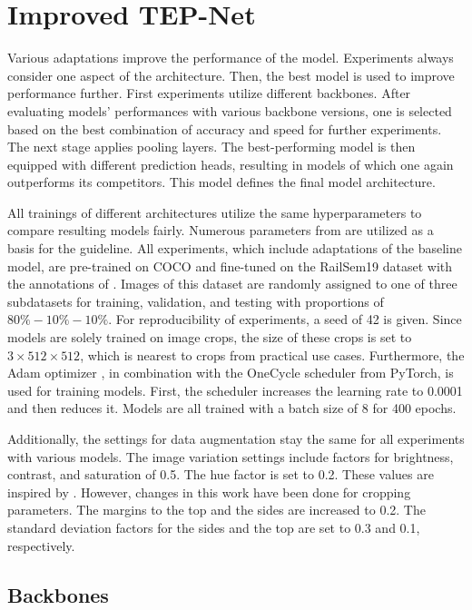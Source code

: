 \section{Improved TEP-Net}
\label{sec:improvedTEPNETExperiments}

Various adaptations improve the performance of the model.
Experiments always consider one aspect of the architecture.
Then, the best model is used to improve performance further.
First experiments utilize different backbones.
After evaluating models' performances with various backbone versions, one is selected based on the best combination of accuracy and speed for further experiments.
The next stage applies pooling layers.
The best-performing model is then equipped with different prediction heads, resulting in models of which one again outperforms its competitors.
This model defines the final model architecture.

All trainings of different architectures utilize the same hyperparameters to compare resulting models fairly.
Numerous parameters from \cite{tepNet2024} are utilized as a basis for the guideline.
All experiments, which include adaptations of the baseline model, are pre-trained on COCO and fine-tuned on the RailSem19 dataset with the annotations of \cite{tepNet2024}.
Images of this dataset are randomly assigned to one of three subdatasets for training, validation, and testing with proportions of $80\%-10\%-10\%$.
For reproducibility of experiments, a seed of 42 is given.
Since models are solely trained on image crops, the size of these crops is set to $3 \times 512 \times 512$, which is nearest to crops from practical use cases.
Furthermore, the Adam optimizer \cite{pytorchAdamOptimizer}, in combination with the OneCycle scheduler \cite{pytorch_oneCycleLR_docu} from PyTorch, is used for training models.
First, the scheduler increases the learning rate to 0.0001 and then reduces it.
Models are all trained with a batch size of 8 for 400 epochs.

Additionally, the settings for data augmentation stay the same for all experiments with various models.
The image variation settings include factors for brightness, contrast, and saturation of 0.5.
The hue factor is set to 0.2.
These values are inspired by \cite{tepNet2024}.
However, changes in this work have been done for cropping parameters.
The margins to the top and the sides are increased to 0.2.
The standard deviation factors for the sides and the top are set to 0.3 and 0.1, respectively.

\subsection{Backbones}

